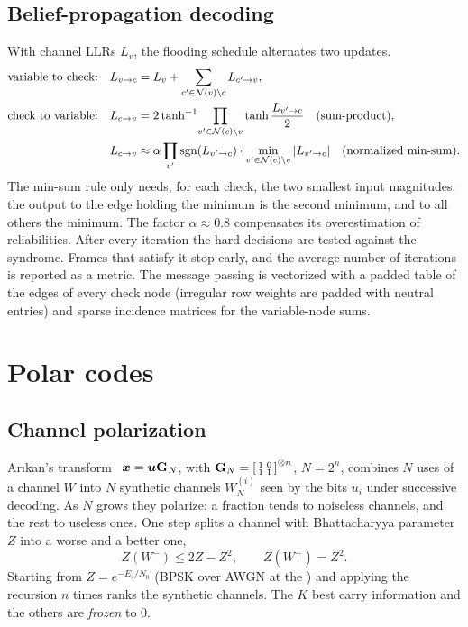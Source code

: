 \subsection{Belief-propagation decoding}
With channel LLRs $L_v$, the flooding schedule alternates two updates.
\begin{align}
  \text{variable to check:}\quad & L_{v\to c}=L_v+\sum_{c'\in\mathcal N(v)\setminus c}L_{c'\to v},\\
  \text{check to variable:}\quad & L_{c\to v}=2\tanh^{-1}\!\prod_{v'\in\mathcal N(c)\setminus v}\tanh\frac{L_{v'\to c}}{2}
  \quad\text{(sum-product)},\\
  & L_{c\to v}\approx\alpha\prod_{v'}\operatorname{sgn}(L_{v'\to c})\cdot\min_{v'\in\mathcal N(c)\setminus v}|L_{v'\to c}|
  \quad\text{(normalized min-sum)}.
\end{align}
The min-sum rule only needs, for each check, the two smallest input magnitudes: the output to
the edge holding the minimum is the second minimum, and to all others the minimum. The factor
$\alpha\approx0.8$ compensates its overestimation of reliabilities. After every iteration the
hard decisions are tested against the syndrome. Frames that satisfy it stop early, and the
average number of iterations is reported as a metric.
The message passing is vectorized with a padded table of the edges of every check node
(irregular row weights are padded with neutral entries) and sparse incidence matrices for the
variable-node sums.

\section{Polar codes}\label{sec:polar}
\subsection{Channel polarization}
Arıkan's transform~\cite{arikan2009} $\bm{x}=\bm{u}\mathbf{G}_N$, with
$\mathbf{G}_N=\begin{bsmallmatrix}1&0\\1&1\end{bsmallmatrix}^{\otimes n}$, $N=2^n$, combines $N$
uses of a channel $W$ into $N$ synthetic channels $W_N^{(i)}$ seen by the bits $u_i$ under
successive decoding. As $N$ grows they polarize: a fraction tends to noiseless channels, and the
rest to useless ones. One step splits a channel with Bhattacharyya parameter $Z$ into a worse
and a better one,
\begin{equation}
  Z(W^-)\le2Z-Z^2,\qquad Z(W^+)=Z^2 .
\end{equation}
Starting from $Z=e^{-E_s/N_0}$ (BPSK over AWGN at the ) and applying the
recursion $n$ times ranks the synthetic channels. The $K$ best carry information and the others
are \emph{frozen} to 0.

